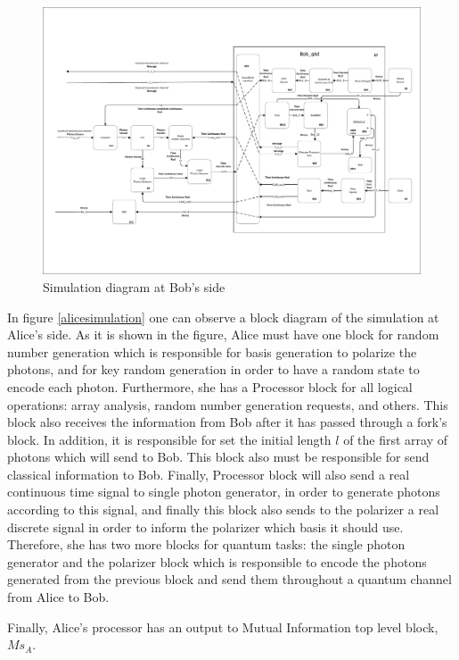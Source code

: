 \begin{refsection}
\begin{figure}[h]
    \centering
        \includegraphics[clip, trim=0.5cm 2.0cm 0.5cm 0.5cm, width=1.00\textwidth]{./sdf/bb84_with_discrete_variables/figures/Simulation_Bob_bb84.pdf}
    \caption{Simulation diagram at Bob's side}\label{bobsimulation}
\end{figure}

    In figure \ref{alicesimulation} one can observe a block diagram of the simulation at Alice's side. As it is shown in the figure, Alice must have one block for random number generation which is responsible for basis generation to polarize the photons, and for key random generation in order to have a random state to encode each photon. Furthermore, she has a Processor block for all logical operations: array analysis, random number generation requests, and others. This block also receives the information from Bob after it has passed through a fork's block. In addition, it is responsible for set the initial length $l$ of the first array of photons which will send to Bob. This block also must be responsible for send classical information to Bob. Finally, Processor block will also send a real continuous time signal to single photon generator, in order to generate photons according to this signal, and finally this block also sends to the polarizer a real discrete signal in order to inform the polarizer which basis it should use. Therefore, she has two more blocks for quantum tasks: the single photon generator and the polarizer block which is responsible to encode the photons generated from the previous block and send them throughout a quantum channel from Alice to Bob.

    Finally, Alice's processor has an output to Mutual Information top level block, $Ms_{A}$.


\end{refsection}
